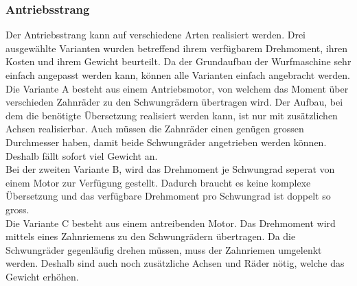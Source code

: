 \subsubsection{Antriebsstrang}

Der Antriebsstrang kann auf verschiedene Arten realisiert werden. Drei ausgewählte Varianten wurden betreffend ihrem verfügbarem Drehmoment, ihren Kosten und ihrem Gewicht beurteilt. Da der Grundaufbau der Wurfmaschine sehr einfach angepasst werden kann, können alle Varianten einfach angebracht werden.\\
Die Variante A besteht aus einem Antriebsmotor, von welchem das Moment über verschieden Zahnräder zu den Schwungrädern übertragen wird. Der Aufbau, bei dem die benötigte Übersetzung realisiert werden kann, ist nur mit zusätzlichen Achsen realisierbar. Auch müssen die Zahnräder einen genügen grossen Durchmesser haben, damit beide Schwungräder angetrieben werden können. Deshalb fällt sofort viel Gewicht an.\\
Bei der zweiten Variante B, wird das Drehmoment je Schwungrad seperat von einem Motor zur Verfügung gestellt. Dadurch braucht es keine komplexe Übersetzung und das verfügbare Drehmoment pro Schwungrad ist doppelt so gross.\\
Die Variante C besteht aus einem antreibenden Motor. Das Drehmoment wird mittels eines Zahnriemens zu den Schwungrädern übertragen. Da die Schwungräder gegenläufig drehen müssen, muss der Zahnriemen umgelenkt werden. Deshalb sind auch noch zusätzliche Achsen und Räder nötig, welche das Gewicht erhöhen.\\

